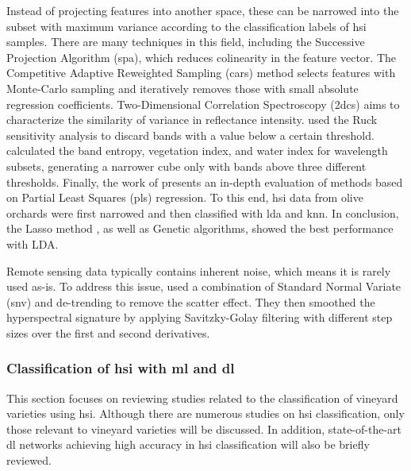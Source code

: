 Instead of projecting features into another space, these can be narrowed into the subset with maximum variance according to the classification labels of \acrshort{hsi} samples. There are many techniques in this field, including the Successive Projection Algorithm (\acrshort{spa}), which reduces colinearity in the feature vector. The Competitive Adaptive Reweighted Sampling (\acrshort{cars}) method selects features with Monte-Carlo sampling and iteratively removes those with small absolute regression coefficients. Two-Dimensional Correlation Spectroscopy (\acrshort{2dcs}) aims to characterize the similarity of variance in reflectance intensity. \cite{liu_dimension_2019} used the Ruck sensitivity analysis to discard bands with a value below a certain threshold. \cite{agilandeeswari_crop_2022} calculated the band entropy, vegetation index, and water index for wavelength subsets, generating a narrower cube only with bands above three different thresholds. Finally, the work of \cite{santos-rufo_wavelength_2020} presents an in-depth evaluation of methods based on Partial Least Squares (\acrshort{pls}) regression. To this end, \acrshort{hsi} data from olive orchards were first narrowed and then classified with \acrshort{lda} and \acrshort{knn}. In conclusion, the Lasso method \cite{friedman_regularization_2010}, as well as Genetic algorithms, \cite{mehmood_review_2012} showed the best performance with LDA. 

Remote sensing data typically contains inherent noise, which means it is rarely used as-is. To address this issue, \cite{gutierrez_--go_2018} used a combination of Standard Normal Variate (\acrshort{snv}) and de-trending to remove the scatter effect. They then smoothed the hyperspectral signature by applying Savitzky-Golay filtering with different step sizes over the first and second derivatives.

\subsubsection{Classification of \acrshort{hsi} with \acrshort{ml} and \acrshort{dl}}

This section focuses on reviewing studies related to the classification of vineyard varieties using \acrshort{hsi}. Although there are numerous studies on \acrshort{hsi} classification, only those relevant to vineyard varieties will be discussed. In addition, state-of-the-art \acrshort{dl} networks achieving high accuracy in \acrshort{hsi} classification will also be briefly reviewed.

